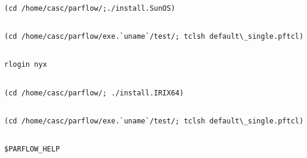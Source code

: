 {\newpage\clearpage
{}%
\begin{display}\begin{verbatim}

(cd /home/casc/parflow/;./install.SunOS)\end{verbatim}
\end{display}%
\lthtmlfigureZ
\lthtmlcheckvsize\clearpage}

{\newpage\clearpage
{}%
\begin{display}\begin{verbatim}

(cd /home/casc/parflow/exe.`uname`/test/; tclsh default\_single.pftcl)\end{verbatim}
\end{display}%
\lthtmlfigureZ
\lthtmlcheckvsize\clearpage}

{\newpage\clearpage
{}%
\begin{display}\begin{verbatim}

rlogin nyx\end{verbatim}
\end{display}%
\lthtmlfigureZ
\lthtmlcheckvsize\clearpage}

{\newpage\clearpage
{}%
\begin{display}\begin{verbatim}

(cd /home/casc/parflow/; ./install.IRIX64)\end{verbatim}
\end{display}%
\lthtmlfigureZ
\lthtmlcheckvsize\clearpage}

{\newpage\clearpage
{}%
\begin{display}\begin{verbatim}

(cd /home/casc/parflow/exe.`uname`/test/; tclsh default\_single.pftcl)\end{verbatim}
\end{display}%
\lthtmlfigureZ
\lthtmlcheckvsize\clearpage}

{\newpage\clearpage
{}%
\begin{display}\begin{verbatim}

$PARFLOW_HELP\end{verbatim}
\end{display}%
\lthtmlfigureZ
\lthtmlcheckvsize\clearpage}

